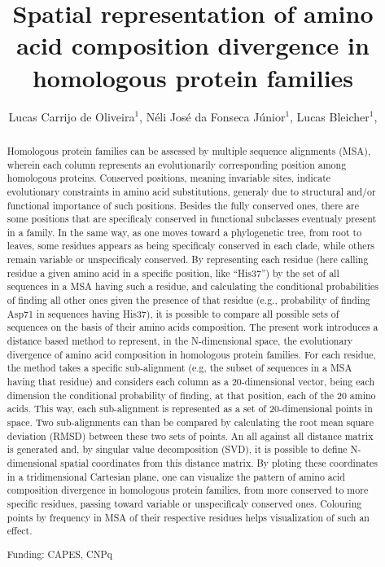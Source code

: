 \documentclass[twoside]{article}
\title{\vspace{-15mm}\fontsize{24pt}{10pt}\selectfont\textbf{ Spatial representation of amino acid composition divergence in homologous protein families }} %
\author{ Lucas Carrijo de Oliveira$^{1}$, Néli José da Fonseca Júnior$^{1}$, Lucas Bleicher$^{1}$, }
\affil{ 1 Federal University of Minas Gerais

 }
\date{}
\begin{document}
  
  
  \maketitle %
  
  
  \thispagestyle{fancy} %
  
  
  \begin{abstract}
  Homologous protein families can be assessed by multiple sequence alignments (MSA), wherein each column represents an evolutionarily corresponding position among homologous proteins. Conserved positions, meaning invariable sites, indicate evolutionary constraints in amino acid substitutions, generaly due to structural and/or functional importance of such positions. Besides the fully conserved ones, there are some positions that are specificaly conserved in functional subclasses eventualy present in a family. In the same way, as one moves toward a phylogenetic tree, from root to leaves, some residues appears as being specificaly conserved in each clade, while others remain variable or unspecificaly conserved. By representing each residue (here calling residue a given amino acid in a specific position, like “His37”) by the set of all sequences in a MSA having such a residue, and calculating the conditional probabilities of finding all other ones given the presence of that residue (e.g., probability of finding Asp71 in sequences having His37), it is possible to compare all possible sets of sequences on the basis of their amino acids composition. The present work introduces a distance based method to represent, in the N-dimensional space, the evolutionary divergence of amino acid composition in homologous protein families. For each residue, the method takes a specific sub-alignment (e.g, the subset of sequences in a MSA having that residue) and considers each column as a 20-dimensional vector, being each dimension the conditional probability of finding, at that position, each of the 20 amino acids. This way, each sub-alignment is represented as a set of 20-dimensional points in space. Two sub-alignments can than be compared by calculating the root mean square deviation (RMSD) between these two sets of points. An all against all distance matrix is generated and, by singular value decomposition (SVD), it is possible to define N-dimensional spatial coordinates from this distance matrix. By ploting these coordinates in a tridimensional Cartesian plane, one can visualize the pattern of amino acid composition divergence in homologous protein families, from more conserved  to more specific residues, passing toward variable or unspecificaly conserved ones. Colouring points by frequency in MSA of their respective residues helps visualization of such an effect.
  
  Funding: CAPES, CNPq \\ 
  \end{abstract}
  
\end{document}
